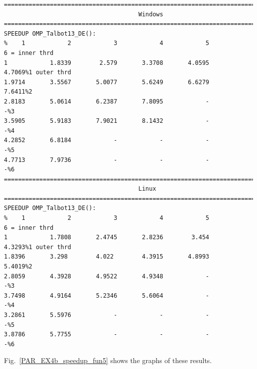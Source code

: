 \documentclass[a4paper,10pt]{report}%
\begin{document}
\begin{lstlisting}
====================================================================================
                                      Windows
====================================================================================
SPEEDUP OMP_Talbot13_DE():
%    1            2            3            4            5            6 = inner thrd
1            1.8339        2.579       3.3708       4.0595       4.7069%1 outer thrd
1.9714       3.5567       5.0077       5.6249       6.6279       7.6411%2
2.8183       5.0614       6.2387       7.8095            -            -%3
3.5905       5.9183       7.9021       8.1432            -            -%4
4.2852       6.8184            -            -            -            -%5
4.7713       7.9736            -            -            -            -%6
====================================================================================
                                      Linux
====================================================================================
SPEEDUP OMP_Talbot13_DE():
%    1            2            3            4            5            6 = inner thrd
1            1.7808       2.4745       2.8236        3.454       4.3293%1 outer thrd
1.8396       3.298        4.022        4.3915       4.8993       5.4019%2
2.8059       4.3928       4.9522       4.9348            -            -%3
3.7498       4.9164       5.2346       5.6064            -            -%4
3.2861       5.5976            -            -            -            -%5
3.8786       5.7755            -            -            -            -%6
\end{lstlisting}
Fig.~\ref{PAR_EX4b_speedup_fun5} shows the graphs of these results.
\end{document}
